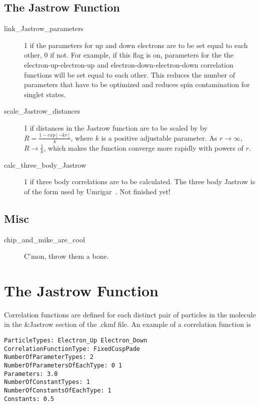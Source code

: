 \documentclass[11pt]{article}
\begin{document}
\subsection{The Jastrow Function}

\begin{description}

\item [link\_Jastrow\_parameters] 1 if the parameters for up and down
  electrons are to be set equal to each other, 0 if not.  For example,
  if this flag is on, parameters for the the electron-up-electron-up
  and electron-down-electron-down correlation functions will be set
  equal to each other.  This reduces the number of parameters that
  have to be optimized and reduces spin contamination for singlet
  states.  

\item [scale\_Jastrow\_distances] 1 if distances in the Jastrow function
  are to be scaled by by $R=\frac{1-exp[-kr]}{k}$, where $k$ is a
  positive adjustable parameter.  As $r \rightarrow \infty$, 
  $R \rightarrow \frac{1}{k}$, which makes the function converge more
  rapidly with powers of $r$. 

\item [calc\_three\_body\_Jastrow] 1 if three body correlations are to be
  calculated.  The three body Jastrow is of the form used by
  Umrigar~\cite{ThreeBodyJastrow}. Not finished yet!

\end{description}

\subsection{Misc}

\begin{description}

\item [chip\_and\_mike\_are\_cool] C'mon, throw them a bone.

\end{description}

\section{The Jastrow Function}

Correlation functions are defined for each distinct pair of particles in the
molecule in the \&Jastrow section of the .ckmf file.  An example of a
correlation function is

\begin{verbatim}
ParticleTypes: Electron_Up Electron_Down
CorrelationFunctionType: FixedCuspPade
NumberOfParameterTypes: 2
NumberOfParametersOfEachType: 0 1
Parameters: 3.0
NumberOfConstantTypes: 1
NumberOfConstantsOfEachType: 1
Constants: 0.5
\end{verbatim}
\end{document}
